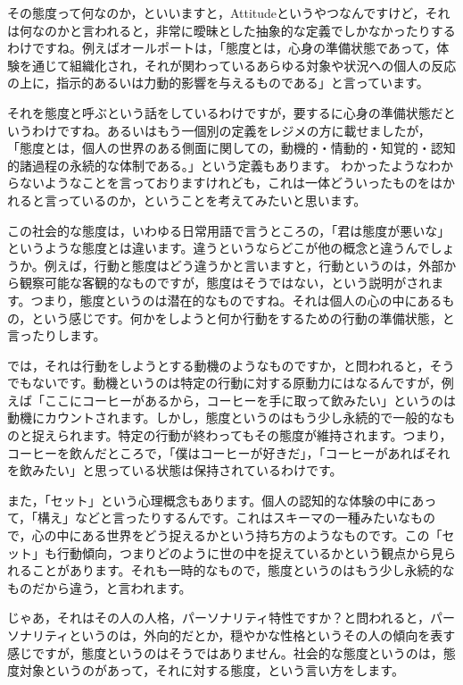 \documentclass{ltjsbook}
\begin{document}
その態度って何なのか，といいますと，Attitudeというやつなんですけど，それは何なのかと言われると，非常に曖昧とした抽象的な定義でしかなかったりするわけですね。例えばオールポートは，「態度とは，心身の準備状態であって，体験を通じて組織化され，それが関わっているあらゆる対象や状況への個人の反応の上に，指示的あるいは力動的影響を与えるものである」と言っています\parencite{Allport1935}。

それを態度と呼ぶという話をしているわけですが，要するに心身の準備状態だというわけですね。あるいはもう一個別の定義をレジメの方に載せましたが， 「態度とは，個人の世界のある側面に関しての，動機的・情動的・知覚的・認知的諸過程の永続的な体制である。」\parencite{Kretch1948}という定義もあります。
わかったようなわからないようなことを言っておりますけれども，これは一体どういったものをはかれると言っているのか，ということを考えてみたいと思います。

この社会的な態度は，いわゆる日常用語で言うところの，「君は態度が悪いな」というような態度とは違います。違うというならどこが他の概念と違うんでしょうか。例えば，行動と態度はどう違うかと言いますと，行動というのは，外部から観察可能な客観的なものですが，態度はそうではない，という説明がされます。つまり，態度というのは潜在的なものですね。それは個人の心の中にあるもの，という感じです。何かをしようと何か行動をするための行動の準備状態，と言ったりします。

では，それは行動をしようとする動機のようなものですか，と問われると，そうでもないです。動機というのは特定の行動に対する原動力にはなるんですが，例えば「ここにコーヒーがあるから，コーヒーを手に取って飲みたい」というのは動機にカウントされます。しかし，態度というのはもう少し永続的で一般的なものと捉えられます。特定の行動が終わってもその態度が維持されます。つまり，コーヒーを飲んだところで，「僕はコーヒーが好きだ」，「コーヒーがあればそれを飲みたい」と思っている状態は保持されているわけです。

また，「セット」という心理概念もあります。個人の認知的な体験の中にあって，「構え」などと言ったりするんです。これはスキーマの一種みたいなもので，心の中にある世界をどう捉えるかという持ち方のようなものです。この「セット」も行動傾向，つまりどのように世の中を捉えているかという観点から見られることがあります。それも一時的なもので，態度というのはもう少し永続的なものだから違う，と言われます。

じゃあ，それはその人の人格，パーソナリティ特性ですか？と問われると，パーソナリティというのは，外向的だとか，穏やかな性格というその人の傾向を表す感じですが，態度というのはそうではありません。社会的な態度というのは，態度対象というのがあって，それに対する態度，という言い方をします。
\end{document}
